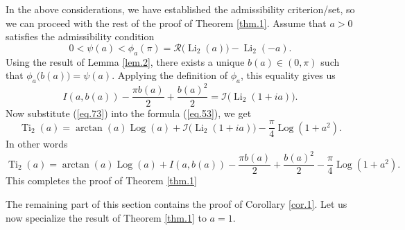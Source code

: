 \documentclass[preprint,12pt,nopreprintline]{elsarticle}
\begin{document}
In the above considerations, we have established the admissibility criterion/set, so we can proceed with the rest of the proof of Theorem \ref{thm.1}. Assume that \(a>0\) satisfies the admissibility condition
\begin{equation}
0<\psi(a)<\phi_a(\pi)
=
\mathscr{R}\!\bigl(\operatorname{Li}_2(a)\bigr)-\operatorname{Li}_2(-a).
\end{equation}
Using the result of Lemma \ref{lem.2}, there exists a unique \(b(a)\in(0,\pi)\) such that \(\phi_a\bigl(b(a)\bigr)=\psi(a)\). Applying the definition of \(\phi_a\), this equality gives us
\begin{equation}\label{eq.73}
I(a,b(a))-\frac{\pi b(a)}{2}+\frac{b(a)^2}{2}
=
\mathscr{I}\!\bigl(\operatorname{Li}_2(1+ia)\bigr).
\end{equation}
Now substitute (\ref{eq.73}) into the formula (\ref{eq.53}), we get
\begin{equation}\label{eq.75}
\operatorname{Ti}_2(a)
=
\arctan(a)\operatorname{Log}(a)
+
\mathscr{I}\!\bigl(\operatorname{Li}_2(1+ia)\bigr)
-\frac{\pi}{4}\operatorname{Log}(1+a^2).
\end{equation}
In other words
\begin{equation}
\operatorname{Ti}_2(a)
=
\arctan(a)\operatorname{Log}(a)
+
I(a,b(a))
-\frac{\pi b(a)}{2}
+\frac{b(a)^2}{2}
-\frac{\pi}{4}\operatorname{Log}(1+a^2).
\end{equation}
This completes the proof of Theorem \ref{thm.1}

The remaining part of this section contains the proof of Corollary \ref{cor.1}. Let us now specialize the result of Theorem \ref{thm.1} to \(a=1\).
\end{document}
